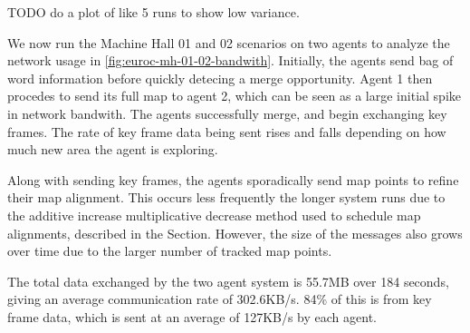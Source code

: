 TODO do a plot of like 5 runs to show low variance.

We now run the Machine Hall 01 and 02 scenarios on two agents to analyze the network usage in \autoref{fig:euroc-mh-01-02-bandwith}. Initially, the agents send bag of word information before quickly detecing a merge opportunity. Agent 1 then procedes to send its full map to agent 2, which can be seen as a large initial spike in network bandwith. The agents successfully merge, and begin exchanging key frames. The rate of key frame data being sent rises and falls depending on how much new area the agent is exploring.

Along with sending key frames, the agents sporadically send map points to refine their map alignment. This occurs less frequently the longer system runs due to the additive increase multiplicative decrease method used to schedule map alignments, described in the  Section. However, the size of the messages also grows over time due to the larger number of tracked map points.

The total data exchanged by the two agent system is 55.7MB over 184 seconds, giving an average communication rate of 302.6KB/s. 84\% of this is from key frame data, which is sent at an average of 127KB/s by each agent.

